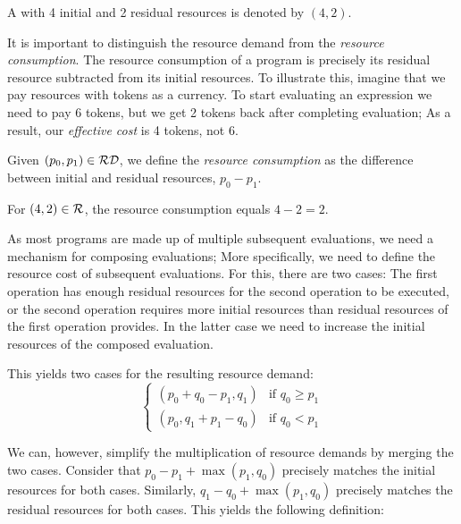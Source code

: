 \begin{example}
   A  with 4 initial and 2 residual resources is denoted by \((4, 2)\).
\end{example}

It is important to distinguish the resource demand from the \emph{resource consumption}. The resource consumption of a program is precisely its residual resource subtracted from its initial resources. To illustrate this, imagine that we pay resources with tokens as a currency. To start evaluating an expression we need to pay 6 tokens, but we get 2 tokens back after completing evaluation; As a result, our \emph{effective cost} is 4 tokens, not 6.

\begin{definition}\label{def:resource-consumption}
   Given \((p_0, p_1) \in \mathcal{RD}\), we define the \emph{resource consumption} as the difference between initial and residual resources, \(p_0 - p_1\).
\end{definition}

\begin{example}
   For \((4, 2) \in \mathcal{R}\), the resource consumption equals \(4 - 2 = 2\).
\end{example}

As most programs are made up of multiple subsequent evaluations, we need a mechanism for composing evaluations; More specifically, we need to define the resource cost of subsequent evaluations. 
For this, there are two cases: The first operation has enough residual resources for the second operation to be executed, or the second operation requires more initial resources than residual resources of the first operation provides. In the latter case we need to increase the initial resources of the composed evaluation.

This yields two cases for the resulting resource demand:
\[
   \begin{cases}
      (p_0 + q_0 - p_1,  q_1) & \mbox{if } q_0 \geq p_1 \\
      (p_0,q_1 + p_1 - q_0) & \mbox{if } q_0 <    p_1 
   \end{cases}
\]

We can, however, simplify the multiplication of resource demands by merging the two cases. Consider that \(p_0 - p_1 + \max(p_1, q_0)\) precisely matches the initial resources for both cases. Similarly, \(q_1 - q_0 + \max(p_1, q_0)\) precisely matches the residual resources for both cases. 
This yields the following definition:


